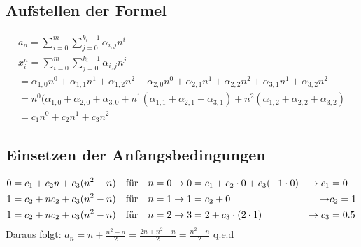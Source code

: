 \documentclass[a4paper,10pt,freqn]{article}
\begin{document}
\subsection{Aufstellen der Formel}
\begin{eqnarray*}
 a_n = \sum_{i=0}^m\sum_{j=0}^{k_i-1} \alpha_{i,j}n^i\\
 x_i^n  =\sum_{i=0}^m\sum_{j=0}^{k_i-1} \alpha_{i,j}n^j\\
 =\alpha_{1,0}n^0+\alpha_{1,1}n^1+\alpha_{1,2}n^2+\alpha_{2,0}n^0+\alpha_{2,1}n^1+\alpha_{2,2}n^2+\alpha_{3,1}n^1+\alpha_{3,2}n^2\\=
 n^0(\alpha_{1,0}+\alpha_{2,0}+\alpha_{3,0}+n^1(\alpha_{1,1}+\alpha_{2,1}+\alpha_{3,1})+n^2(\alpha_{1,2}+\alpha_{2,2}+\alpha_{3,2})\\=
 c_1n^0+c_2n^1+c_3n^2
\end{eqnarray*}

\subsection{Einsetzen der Anfangsbedingungen}
\begin{align*}
 0&=c_1+c_2n+c_3(n^2-n) &\text{für\quad}& n = 0\rightarrow 0 = c_1+c_2\cdot0+c_3(-1\cdot0) &\rightarrow c_1& = 0\\
 1&=c_2+nc_2+c_3(n^2-n) &\text{für\quad}& n = 1\rightarrow 1 = c_2+0 &\rightarrow& c_2 = 1\\
 1&=c_2+nc_2+c_3(n^2-n) &\text{für\quad}& n = 2\rightarrow 3 = 2+c_3\cdot(2\cdot1) &\rightarrow c_3& = 0.5\\
\end{align*}
Daraus folgt: $a_n = n+\frac{n^2-n}{2}=\frac{2n+n^2-n}{2}=\frac{n^2+n}{2}$ q.e.d
\end{document}
